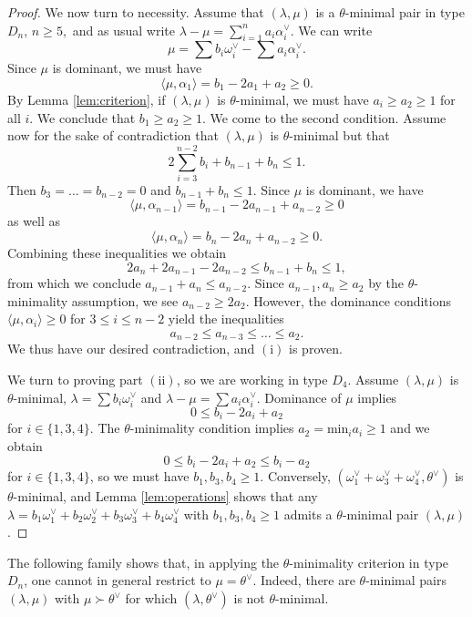 \documentclass[a4paper, 12pt]{amsart}
\theoremstyle{definition}
\begin{document}
\begin{proof}
We now turn to necessity. Assume that $(\lambda, \mu)$ is a $\theta$-minimal pair in type $D_n$, $n \geq 5,$ and as usual write $\lambda-\mu=\sum_{i=1}^{n} a_i \alpha_i^\vee$. We can write 
\[\mu=\sum b_i \omega_i^\vee - \sum a_i \alpha_i^\vee.\] Since $\mu$ is dominant, we must have \[\langle \mu, \alpha_1 \rangle = b_1-2a_1+a_2 \geq 0.\] By Lemma \ref{lem:criterion}, if $(\lambda, \mu)$ is $\theta$-minimal, we must have $a_i \geq a_2 \geq 1$ for all $i$. We conclude that $b_1 \geq a_2 \geq 1$.
We come to the second condition. Assume now for the sake of contradiction that $(\lambda,\mu)$ is $\theta$-minimal but that \[2 \sum_{i=3}^{n-2} b_i +b_{n-1}+b_n \leq 1.\]
Then $b_3 = \dots =b_{n-2}=0$ and $b_{n-1}+b_{n} \leq 1$. Since $\mu$ is dominant, we have 
\[\langle \mu, \alpha_{n-1} \rangle= b_{n-1}-2a_{n-1}+a_{n-2} \geq 0\] 
as well as 
\[\langle \mu, \alpha_n \rangle = b_n -2a_n+a_{n-2} \geq 0.\]
Combining these inequalities we obtain 
\[2a_n+2a_{n-1}-2a_{n-2} \leq b_{n-1}+b_n \leq 1,\]
from which we conclude $a_{n-1}+a_n \leq a_{n-2}$. Since $a_{n-1},a_n \geq a_2$ by the $\theta$-minimality assumption, we see $a_{n-2} \geq 2a_2$. However, the dominance conditions $\langle \mu, \alpha_i \rangle \geq 0$ for $3 \leq i \leq n-2$ yield the inequalities
\[a_{n-2} \leq a_{n-3} \leq \dots \leq a_2.\] 
We thus have our desired contradiction, and $(\mathrm{i})$ is proven.

We turn to proving part $(\mathrm{ii})$, so we are working in type $D_4$. Assume $(\lambda,\mu)$ is $\theta$-minimal, $\lambda= \sum b_i \omega_i^\vee$ and $\lambda-\mu= \sum a_i \alpha_i^\vee$. Dominance of $\mu$ implies 
\[0 \leq b_i -2a_i+a_2 \]
for $i \in \{1,3,4\}$. The $\theta$-minimality condition implies $a_2=\mathrm{min}_i a_i \geq 1$ and we obtain 
\[0 \leq b_i-2a_i+a_2 \leq b_i-a_2\] 
for $i \in \{1,3,4\}$, so we must have $b_1, b_3, b_4 \geq 1$. Conversely, $(\omega_1^\vee+\omega_3^\vee+\omega_4^\vee, \theta^\vee)$ is $\theta$-minimal, and Lemma \ref{lem:operations} shows that any $\lambda= b_1\omega_1^\vee+b_2\omega_2^\vee+b_3 \omega_3^\vee+b_4\omega_4^\vee$ with $b_1, b_3, b_4 \geq 1$ admits a $\theta$-minimal pair $(\lambda, \mu)$.
\end{proof}
\fi


The following family shows that, in applying the
$\theta$-minimality criterion in type $D_n$, one cannot in general
restrict to $\mu=\theta^\vee$. Indeed, there are $\theta$-minimal pairs
$(\lambda,\mu)$ with $\mu\succ\theta^\vee$ for which
$(\lambda,\theta^\vee)$ is not $\theta$-minimal.
\end{document}

